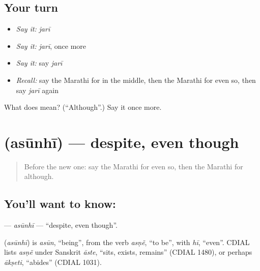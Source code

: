 \subsection*{Your turn}
\begin{itemize}
\raggedright
  \item \emph{Say it:} \emph{jarī}
  \item \emph{Say it:} \emph{jarī}, once more
  \item \emph{Say it:} say \emph{jarī}
  \item \emph{Recall:} say the Marathi for in the middle, then the Marathi for even so, then say \emph{jarī} again
\end{itemize}

\begin{tcolorbox}[breakable,colback=teal!4,colframe=teal!35!black,title={Before you move on}]
What does  mean? (\textquotedblleft{}Although\textquotedblright{}.) Say it once more.
\end{tcolorbox}
\section[\texorpdfstring{\mr{असूनही} (asūnhī)}{असूनही (asūnhī)}]{ (asūnhī) — despite, even though}

\label{lesson:MR-C173-asunhi}



\begin{quote}
Before the new one: say the Marathi for even so, then the Marathi for although.
\end{quote}

\subsection*{You'll want to know: }
\textbf{} — \emph{asūnhī} — \textquotedblleft{}despite, even though\textquotedblright{}.

\begin{cousinweb}
\textbf{} (\emph{asūnhī}) is \emph{asūn}, \textquotedblleft{}being\textquotedblright{}, from the verb \emph{asṇẽ}, \textquotedblleft{}to be\textquotedblright{}, with \emph{hī}, \textquotedblleft{}even\textquotedblright{}. CDIAL lists \emph{asṇẽ} under Sanskrit \emph{āste}, \textquotedblleft{}sits, exists, remains\textquotedblright{} (CDIAL 1480), or perhaps \emph{ākṣeti}, \textquotedblleft{}abides\textquotedblright{} (CDIAL 1031).
\end{cousinweb}

